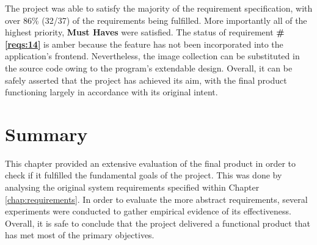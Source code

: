 \documentclass{l4proj}
\begin{document}
The project was able to satisfy the majority of the requirement specification, with over 86\% (32/37) of the requirements being fulfilled. More importantly all of the highest priority, \textbf{Must Haves} were satisfied. The status of requirement \textbf{\#\ref{reqs:14}} is amber because the feature has not been incorporated into the application's frontend. Nevertheless, the image collection can be substituted in the source code owing to the program's extendable design. Overall, it can be safely asserted that the project has achieved its aim, with the final product functioning largely in accordance with its original intent.


\section{Summary}
This chapter provided an extensive evaluation of the final product in order to check if it fulfilled the fundamental goals of the project. This was done by analysing the original system requirements specified within Chapter \ref{chap:requirements}. In order to evaluate the more abstract requirements, several experiments were conducted to gather empirical evidence of its effectiveness. Overall, it is safe to conclude that the project delivered a functional product that has met most of the primary objectives. 



\end{document}
